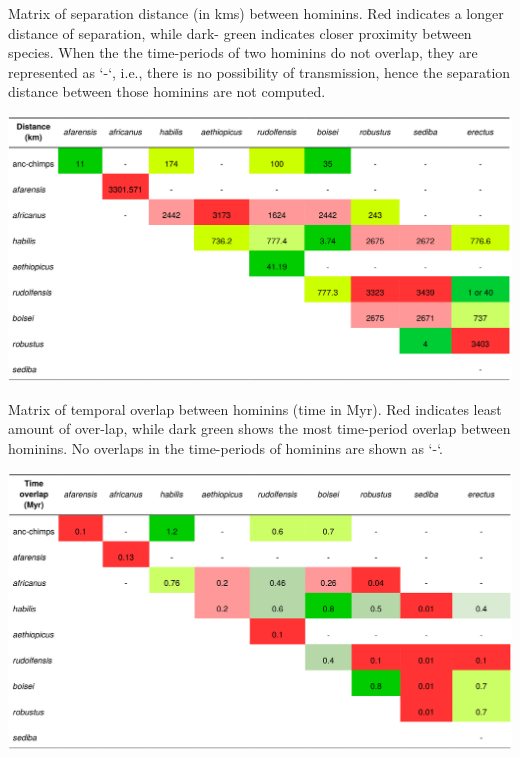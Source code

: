 \documentclass[fleqn,10pt]{wlscirep}
\begin{document}
\setcounter{table}{1} 
\begin{landscape}
\begin{table}[!h]
	\caption{Matrix of separation distance (in kms) between hominins. Red indicates a longer distance of separation, while dark-
		green indicates closer proximity between species. When the the time-periods of two hominins do not overlap, they are represented as `-`, i.e., there is no possibility of transmission, hence the separation distance between those hominins are not computed.}
	\centering
	\label{table:distance}   
	\includegraphics[width=\textwidth]{figs/distance}
\end{table}  

\begin{table}[!h]
	\caption{Matrix of temporal overlap between hominins (time in Myr). Red indicates least amount of over-lap, while dark green
		shows the most time-period overlap between hominins. No overlaps in the time-periods of hominins are shown as `-`.}
	\centering
	\label{table:time}  
	\includegraphics[width=\textwidth]{figs/time}
 
\end{table}  
\end{landscape}
\end{document}
